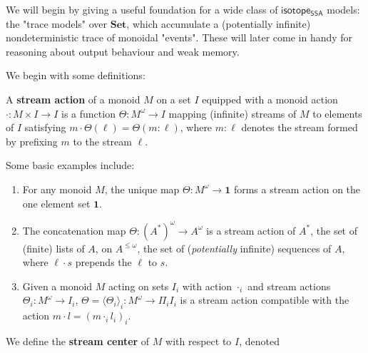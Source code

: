 \documentclass[acmsmall,screen,review]{acmart}
\newcommand{\mb}[1]{\ensuremath{\mathbf{#1}}}
\newcommand{\ms}[1]{\ensuremath{\mathsf{#1}}}
\newcommand{\nats}{\mathbb{N}}
\newcommand{\isotopessa}{\ms{isotope_{SSA}}}
\begin{document}
\label{ssec:trace-monads}

We will begin by giving a useful foundation for a wide class of \isotopessa
models: the "trace models" over \(\mb{Set}\), which accumulate a (potentially
infinite) nondeterministic trace of monoidal "events". These will later come in
handy for reasoning about output behaviour and weak memory.

We begin with some definitions:
\begin{definition}
  A \textbf{stream action} of a monoid \(M\) on a set \(I\) equipped with a
  monoid action \(\cdot: M \times I \to I\) is a function \(\Theta: M^\omega \to
  I\) mapping (infinite) streams of \(M\) to elements of \(I\) satisfying
  \(
    m \cdot \Theta(\ell) = \Theta(m \colon \ell)
  \),
  where \(m \colon \ell\) denotes the stream formed by prefixing \(m\) to the
  stream \(\ell\).
\end{definition}
Some basic examples include:
\begin{enumerate}
  \item For any monoid \(M\), the unique map \(\Theta: M^\omega \to \mathbf{1}\)
  forms a stream action on the one element set \(\mathbf{1}\).
  \item The concatenation map \(\Theta: (A^*)^\omega \to A^\omega\) is a stream
  action of \(A^*\), the set of (finite) lists of \(A\), on \(A^{\leq \omega}\),
  the set of (\textit{potentially} infinite) sequences of \(A\), where \(\ell
  \cdot s\) prepends the \(\ell\) to \(s\).
  \item Given a monoid \(M\) acting on sets \(I_i\) with action \(\cdot_i\) and
  stream actions \(\Theta_i: M^\omega \to I_i\), \(\Theta =
  \langle\Theta_i\rangle_i: M^\omega \to \Pi_iI_i\) is a stream action
  compatible with the action \(m \cdot l = (m \cdot_i l_i)_i\).
\end{enumerate}
We define the \textbf{stream center} of \(M\) with respect to \(I\), denoted
\end{document}
